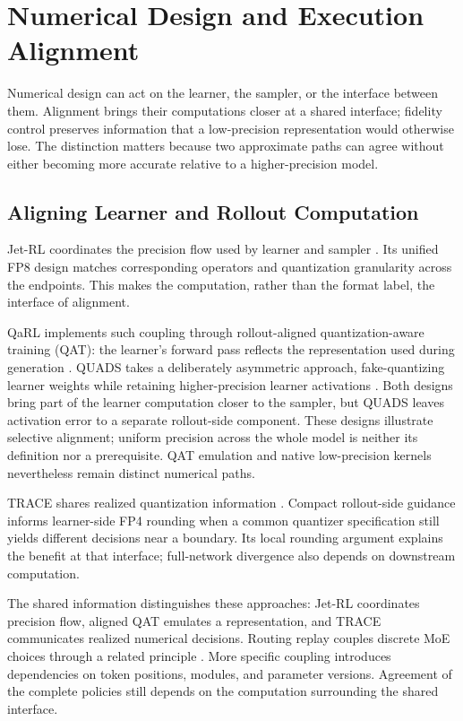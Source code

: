 \section{Numerical Design and Execution Alignment}\label{sec:numerical}
Numerical design can act on the learner, the sampler, or the interface between them. Alignment brings their computations closer at a shared interface; fidelity control preserves information that a low-precision representation would otherwise lose. The distinction matters because two approximate paths can agree without either becoming more accurate relative to a higher-precision model.

\subsection{Aligning Learner and Rollout Computation}\label{sec:a1}
Jet-RL coordinates the precision flow used by learner and sampler \citep{jet}. Its unified FP8 design matches corresponding operators and quantization granularity across the endpoints. This makes the computation, rather than the format label, the interface of alignment.

QaRL implements such coupling through rollout-aligned quantization-aware training (QAT): the learner's forward pass reflects the representation used during generation \citep{qarl}. QUADS takes a deliberately asymmetric approach, fake-quantizing learner weights while retaining higher-precision learner activations \citep{quads}. Both designs bring part of the learner computation closer to the sampler, but QUADS leaves activation error to a separate rollout-side component. These designs illustrate selective alignment; uniform precision across the whole model is neither its definition nor a prerequisite. QAT emulation and native low-precision kernels nevertheless remain distinct numerical paths.

TRACE shares realized quantization information \citep{trace}. Compact rollout-side guidance informs learner-side FP4 rounding when a common quantizer specification still yields different decisions near a boundary. Its local rounding argument explains the benefit at that interface; full-network divergence also depends on downstream computation.

The shared information distinguishes these approaches: Jet-RL coordinates precision flow, aligned QAT emulates a representation, and TRACE communicates realized numerical decisions. Routing replay couples discrete MoE choices through a related principle \citep{r3}. More specific coupling introduces dependencies on token positions, modules, and parameter versions. Agreement of the complete policies still depends on the computation surrounding the shared interface.

